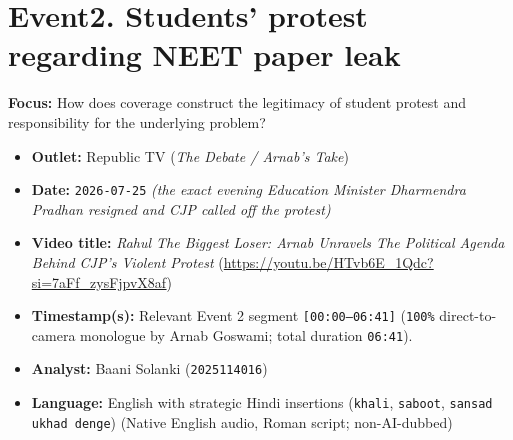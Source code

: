\documentclass[10pt,a4paper]{article}
\begin{document}
\section*{Event2. Students' protest regarding NEET paper leak}
\textbf{Focus:} How does coverage construct the legitimacy of student protest and responsibility for the underlying problem?

\begin{itemize}[leftmargin=1.5em, itemsep=3pt, topsep=4pt]
  \item \textbf{Outlet:} Republic TV (\textit{The Debate / Arnab's Take})
  \item \textbf{Date:} \texttt{2026-07-25} \textit{(the exact evening Education Minister Dharmendra Pradhan resigned and CJP called off the protest)}
  \item \textbf{Video title:} \textit{Rahul The Biggest Loser: Arnab Unravels The Political Agenda Behind CJP's Violent Protest} (\url{https://youtu.be/HTvb6E_1Qdc?si=7aFf_zysFjpvX8af})
  \item \textbf{Timestamp(s):} Relevant Event 2 segment \texttt{[00:00--06:41]} (\texttt{100\%} direct-to-camera monologue by Arnab Goswami; total duration \texttt{06:41}).
  \item \textbf{Analyst:} Baani Solanki (\texttt{2025114016})
  \item \textbf{Language:} English with strategic Hindi insertions (\texttt{khali}, \texttt{saboot}, \texttt{sansad ukhad denge}) (Native English audio, Roman script; non-AI-dubbed)
\end{itemize}
\end{document}
